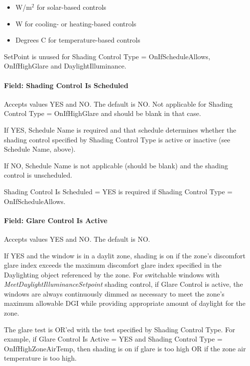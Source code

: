 \begin{itemize}
\item
  W/m\(^{2}\) for solar-based controls
\item
  W for cooling- or heating-based controls
\item
  Degrees C for temperature-based controls
\end{itemize}

SetPoint is unused for Shading Control Type = OnIfScheduleAllows, OnIfHighGlare and DaylightIlluminance.

\paragraph{Field: Shading Control Is Scheduled}\label{field-shading-control-is-scheduled}

Accepts values YES and NO. The default is NO. Not applicable for Shading Control Type = OnIfHighGlare and should be blank in that case.

If YES, Schedule Name is required and that schedule determines whether the shading control specified by Shading Control Type is active or inactive (see Schedule Name, above).

If NO, Schedule Name is not applicable (should be blank) and the shading control is unscheduled.

Shading Control Is Scheduled = YES is required if Shading Control Type = OnIfScheduleAllows.

\paragraph{Field: Glare Control Is Active}\label{field-glare-control-is-active}

Accepts values YES and NO. The default is NO.

If YES and the window is in a daylit zone, shading is on if the zone's discomfort glare index exceeds the maximum discomfort glare index specified in the Daylighting object referenced by the zone. For switchable windows with \emph{MeetDaylightIlluminanceSetpoint} shading control, if Glare Control is active, the windows are always continuously dimmed as necessary to meet the zone's maximum allowable DGI while providing appropriate amount of daylight for the zone.

The glare test is OR'ed with the test specified by Shading Control Type. For example, if Glare Control Is Active = YES and Shading Control Type = OnIfHighZoneAirTemp, then shading is on if glare is too high OR if the zone air temperature is too high.

